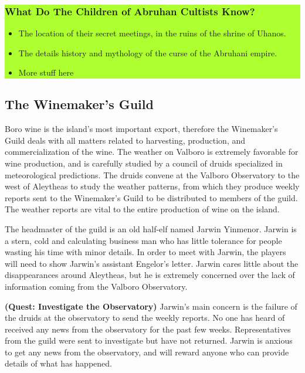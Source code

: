 \begin{multicols*}{2}
\colorbox{GreenYellow}{\begin{minipage}{0.4\textwidth}
		\subsubsection*{What Do The Children of Abruhan Cultists Know?}
		\begin{itemize}
			\item The location of their secret meetings, in the ruins of the shrine of Uhanos.
			\item The details history and mythology of the curse of the Abruhani empire.
			\item More stuff here
		\end{itemize}
\end{minipage}}
\break

\subsection{The Winemaker's Guild}

Boro wine is the island's most important export, therefore the Winemaker's Guild deals with all matters related to harvesting, production, and commercialization of the wine. The weather on Valboro is extremely favorable for wine production, and is carefully studied by a council of druids specialized in meteorological predictions. The druids convene at the Valboro Observatory to the west of Aleytheas to study the weather patterns, from which they produce weekly reports sent to the Winemaker's Guild to be distributed to members of the guild. The weather reports are vital to the entire production of wine on the island.

The headmaster of the guild is an old half-elf named Jarwin Yinmenor. Jarwin is a stern, cold and calculating business man who has little tolerance for people wasting his time with minor details. In order to meet with Jarwin, the players will need to show Jarwin's assistant Engelor's letter. Jarwin cares little about the disappearances around Aleytheas, but he is extremely concerned over the lack of information coming from the Valboro Observatory.

\textbf{(Quest: Investigate the Observatory)} Jarwin's main concern is the failure of the druids at the observatory to send the weekly reports. No one has heard of received any news from the observatory for the past few weeks. Representatives from the guild were sent to investigate but have not returned. Jarwin is anxious to get any news from the observatory, and will reward anyone who can provide details of what has happened.



\end{multicols*}
